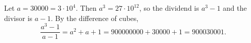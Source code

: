 Let $a=30000=3\cdot10^4$. Then $a^3=27\cdot10^{12}$, so the dividend is $a^3-1$ and the divisor is $a-1$. By the difference of cubes,
\[\dfrac{a^3-1}{a-1}=a^2+a+1=900000000+30000+1=\boxed{900030001}.\]
